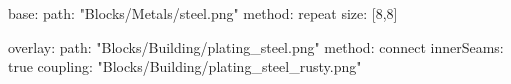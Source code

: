base:
  path: "Blocks/Metals/steel.png"
  method: repeat
  size: [8,8]

overlay:
  path: "Blocks/Building/plating_steel.png"
  method: connect
  innerSeams: true
  coupling: "Blocks/Building/plating_steel_rusty.png"